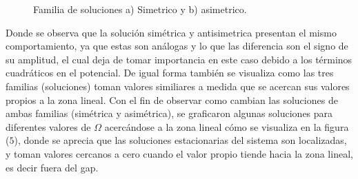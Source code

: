 \documentclass[11pt,letterpaper,twocolumn]{article}
\begin{document}
\begin{figure}[h!]
\caption{Familia de soluciones a) Simetrico y b) asimetrico. }
\end{figure}
\par 
Donde se observa que la solución simétrica y antisimetrica presentan el mismo comportamiento, ya que estas son análogas y lo que las diferencia son el signo de su amplitud, el cual deja de tomar importancia en este caso debido a los términos cuadráticos en el potencial. De igual forma también se visualiza como las tres familias (soluciones) toman valores similiares a medida que se acercan sus valores propios a la zona lineal. Con el fin de observar como cambian las soluciones de ambas familias (simétrica y asimétrica), se graficaron algunas soluciones para diferentes valores de $\Omega$ acercándose a la zona lineal cómo se visualiza en la figura ($5$), donde se aprecia que las soluciones estacionarias del sistema son localizadas, y toman valores cercanos a cero cuando el valor propio tiende hacia la zona lineal, es decir fuera del gap.
\end{document}
